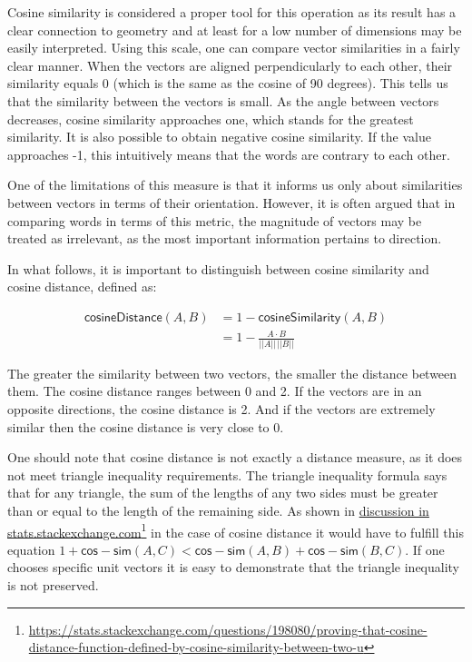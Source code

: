 \documentclass[12pt,]{book}
\begin{document}
Cosine similarity is considered a proper tool for this operation as its
result has a clear connection to geometry and at least for a low number
of dimensions may be easily interpreted. Using this scale, one can
compare vector similarities in a fairly clear manner. When the vectors
are aligned perpendicularly to each other, their similarity equals 0
(which is the same as the cosine of 90 degrees). This tells us that the
similarity between the vectors is small. As the angle between vectors
decreases, cosine similarity approaches one, which stands for the
greatest similarity. It is also possible to obtain negative cosine
similarity. If the value approaches -1, this intuitively means that the
words are contrary to each other.

One of the limitations of this measure is that it informs us only about
similarities between vectors in terms of their orientation. However, it
is often argued that in comparing words in terms of this metric, the
magnitude of vectors may be treated as irrelevant, as the most important
information pertains to direction.

In what follows, it is important to distinguish between cosine
similarity and cosine distance, defined as:

\begin{align} \tag{Sim}
\mathsf{cosineDistance}(A,B) &  = 1 - \mathsf{cosineSimilarity}(A,B)\\
 &  = 1 - \frac{A \cdot B}{\vert \vert A \vert \vert \,\vert \vert B \vert \vert} \nonumber
\end{align}

The greater the similarity between two vectors, the smaller the distance
between them. The cosine distance ranges between 0 and 2. If the vectors
are in an opposite directions, the cosine distance is 2. And if the
vectors are extremely similar then the cosine distance is very close to
0.

One should note that cosine distance is not exactly a distance measure,
as it does not meet triangle inequality requirements. The triangle
inequality formula says that for any triangle, the sum of the lengths of
any two sides must be greater than or equal to the length of the
remaining side. As shown in
\href{https://stats.stackexchange.com/questions/198080/proving-that-cosine-distance-function-defined-by-cosine-similarity-between-two-u}{discussion
in stats.stackexchange.com}\footnote{\url{https://stats.stackexchange.com/questions/198080/proving-that-cosine-distance-function-defined-by-cosine-similarity-between-two-u}}
in the case of cosine distance it would have to fulfill this equation
\(1+\mathsf{cos-sim}(A,C) < \mathsf{cos-sim}(A,B) + \mathsf{cos-sim}(B,C)\).
If one chooses specific unit vectors it is easy to demonstrate that the
triangle inequality is not preserved.
\end{document}
